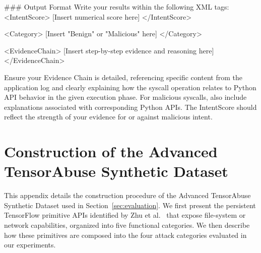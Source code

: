 \begin{tcblisting}
### Output Format
Write your results within the following XML tags:
<IntentScore>
[Insert numerical score here]
</IntentScore>

<Category>
[Insert "Benign" or "Malicious" here]
</Category>

<EvidenceChain>
[Insert step-by-step evidence and reasoning here]
</EvidenceChain>

Ensure your Evidence Chain is detailed, referencing specific content from the application log and clearly explaining how the syscall operation relates to Python API behavior in the given execution phase. For malicious syscalls, also include explanations associated with corresponding Python APIs. The IntentScore should reflect the strength of your evidence for or against malicious intent.
\end{tcblisting}

\section{Construction of the Advanced TensorAbuse Synthetic Dataset}
\label{appendix:dataset}

This appendix details the construction procedure of the Advanced TensorAbuse Synthetic Dataset used in Section~\ref{sec:evaluation}. We first present the persistent TensorFlow primitive APIs identified by Zhu et al.~\cite{zhu2025} that expose file-system or network capabilities, organized into five functional categories. We then describe how these primitives are composed into the four attack categories evaluated in our experiments.

